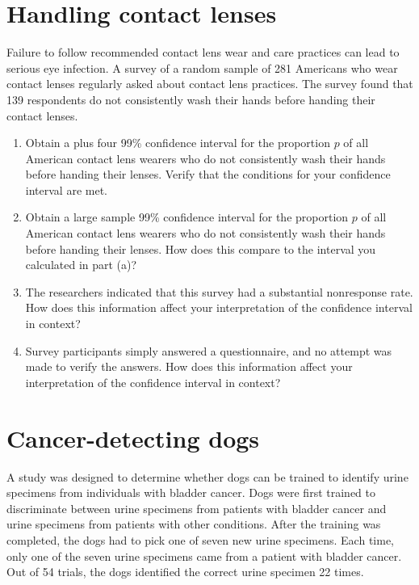 \documentclass[letterpaper,9pt,twoside,printwatermark=false]{pinp}
\providecommand{\tightlist}{%
  \setlength{\itemsep}{0pt}\setlength{\parskip}{0pt}}
\begin{document}
\newpage

\section{Handling contact lenses}\label{handling-contact-lenses}

Failure to follow recommended contact lens wear and care practices can
lead to serious eye infection. A survey of a random sample of 281
Americans who wear contact lenses regularly asked about contact lens
practices. The survey found that 139 respondents do not consistently
wash their hands before handing their contact lenses.

\begin{enumerate}
\def\labelenumi{\alph{enumi}.}
\tightlist
\item
  Obtain a plus four 99\% confidence interval for the proportion \(p\)
  of all American contact lens wearers who do not consistently wash
  their hands before handing their lenses. Verify that the conditions
  for your confidence interval are met.
\item
  Obtain a large sample 99\% confidence interval for the proportion
  \(p\) of all American contact lens wearers who do not consistently
  wash their hands before handing their lenses. How does this compare to
  the interval you calculated in part (a)?
\item
  The researchers indicated that this survey had a substantial
  nonresponse rate. How does this information affect your interpretation
  of the confidence interval in context?
\item
  Survey participants simply answered a questionnaire, and no attempt
  was made to verify the answers. How does this information affect your
  interpretation of the confidence interval in context?
\end{enumerate}

\section{Cancer-detecting dogs}\label{cancer-detecting-dogs}

A study was designed to determine whether dogs can be trained to
identify urine specimens from individuals with bladder cancer. Dogs were
first trained to discriminate between urine specimens from patients with
bladder cancer and urine specimens from patients with other conditions.
After the training was completed, the dogs had to pick one of seven new
urine specimens. Each time, only one of the seven urine specimens came
from a patient with bladder cancer. Out of 54 trials, the dogs
identified the correct urine specimen 22 times.
\end{document}
